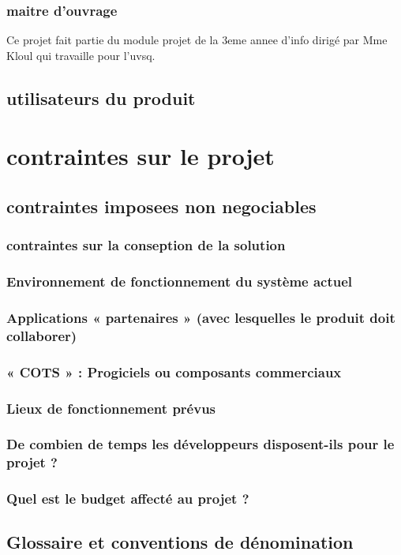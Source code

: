 \documentclass[a4]{article}
\begin{document}
			\subsubsection{maitre d'ouvrage}
				Ce projet fait partie du module projet de la 3eme annee d'info dirigé par Mme Kloul qui travaille pour l'uvsq.			
		\subsection{utilisateurs du produit}
			
	\section{contraintes sur le projet}
		\subsection{contraintes imposees non negociables} 
			\subsubsection{contraintes sur la conseption de la solution}
			\subsubsection{ Environnement de fonctionnement du système actuel }
			\subsubsection{Applications « partenaires » (avec lesquelles le produit doit collaborer)}		
			\subsubsection{« COTS » : Progiciels ou composants commerciaux}
			\subsubsection{Lieux de fonctionnement prévus}
			\subsubsection{ De combien de temps les développeurs disposent-ils pour le projet ?}
			\subsubsection{ Quel est le budget affecté au projet ?}
		\subsection{Glossaire et conventions de dénomination}
\end{document}
